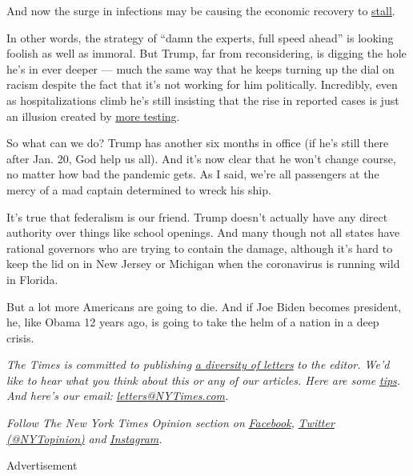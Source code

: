 And now the surge in infections may be causing the economic recovery to
\href{https://www.wsj.com/articles/new-coronavirus-surges-stall-economic-recovery-11594209321}{stall}.

In other words, the strategy of ``damn the experts, full speed ahead''
is looking foolish as well as immoral. But Trump, far from
reconsidering, is digging the hole he's in ever deeper --- much the same
way that he keeps turning up the dial on racism despite the fact that
it's not working for him politically. Incredibly, even as
hospitalizations climb he's still insisting that the rise in reported
cases is just an illusion created by
\href{https://twitter.com/GarrettHaake/status/1281209237281046529}{more
testing}.

So what can we do? Trump has another six months in office (if he's still
there after Jan. 20, God help us all). And it's now clear that he won't
change course, no matter how bad the pandemic gets. As I said, we're all
passengers at the mercy of a mad captain determined to wreck his ship.

It's true that federalism is our friend. Trump doesn't actually have any
direct authority over things like school openings. And many though not
all states have rational governors who are trying to contain the damage,
although it's hard to keep the lid on in New Jersey or Michigan when the
coronavirus is running wild in Florida.

But a lot more Americans are going to die. And if Joe Biden becomes
president, he, like Obama 12 years ago, is going to take the helm of a
nation in a deep crisis.

\emph{The Times is committed to publishing}
\href{https://www.nytimes3xbfgragh.onion/2019/01/31/opinion/letters/letters-to-editor-new-york-times-women.html}{\emph{a
diversity of letters}} \emph{to the editor. We'd like to hear what you
think about this or any of our articles. Here are some}
\href{https://help.nytimes3xbfgragh.onion/hc/en-us/articles/115014925288-How-to-submit-a-letter-to-the-editor}{\emph{tips}}\emph{.
And here's our email:}
\href{mailto:letters@NYTimes.com}{\emph{letters@NYTimes.com}}\emph{.}

\emph{Follow The New York Times Opinion section on}
\href{https://www.facebookcorewwwi.onion/nytopinion}{\emph{Facebook}}\emph{,}
\href{http://twitter.com/NYTOpinion}{\emph{Twitter (@NYTopinion)}}
\emph{and}
\href{https://www.instagram.com/nytopinion/}{\emph{Instagram}}\emph{.}

Advertisement

